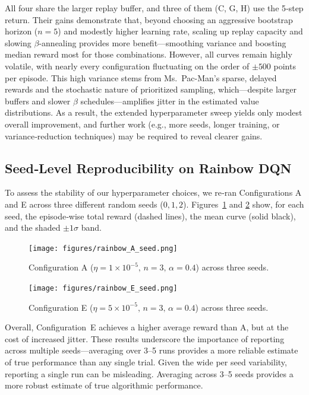 \documentclass{article}
\begin{document}
All four share the larger replay buffer, and three of them (C, G, H) use the 5‑step return. Their gains demonstrate that, beyond choosing an aggressive bootstrap horizon (\(n=5\)) and modestly higher learning rate, scaling up replay capacity and slowing \(\beta\)-annealing provides more benefit—smoothing variance and boosting median reward most for those combinations. However, all curves remain highly volatile, with nearly every configuration fluctuating on the order of \(\pm500\) points per episode. This high variance stems from Ms.\ Pac-Man’s sparse, delayed rewards and the stochastic nature of prioritized sampling, which—despite larger buffers and slower \(\beta\) schedules—amplifies jitter in the estimated value distributions. As a result, the extended hyperparameter sweep yields only modest overall improvement, and further work (e.g., more seeds, longer training, or variance‐reduction techniques) may be required to reveal clearer gains.  

\subsection{Seed‐Level Reproducibility on Rainbow DQN}

To assess the stability of our hyperparameter choices, we re‑ran Configurations A and E across three different random seeds (\(0,1,2\)). Figures~\ref{fig:seed_A} and \ref{fig:seed_E} show, for each seed, the episode‑wise total reward (dashed lines), the mean curve (solid black), and the shaded \(\pm1\sigma\) band.

\begin{figure}[ht]
  \centering
  \texttt{[image: figures/rainbow\_A\_seed.png]}
  \caption{Configuration A (\(\eta=1\times10^{-5},\,n=3,\,\alpha=0.4\)) across three seeds.}
  \label{fig:seed_A}
\end{figure}

\begin{figure}[ht]
  \centering
  \texttt{[image: figures/rainbow\_E\_seed.png]}
  \caption{Configuration E (\(\eta=5\times10^{-5},\,n=3,\,\alpha=0.4\)) across three seeds.}
  \label{fig:seed_E}
\end{figure}

Overall, Configuration E achieves a higher average reward than A, but at the cost of increased jitter. These results underscore the importance of reporting across multiple seeds—averaging over 3–5 runs provides a more reliable estimate of true performance than any single trial. Given the wide per seed variability, reporting a single run can be misleading. Averaging across 3–5 seeds provides a more robust estimate of true algorithmic performance.
\end{document}
